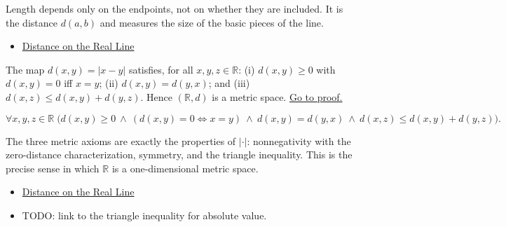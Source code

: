 \begin{remark*}[Interpretation]
Length depends only on the endpoints, not on whether they are included. It is the distance $d(a,b)$ and measures the size of the basic pieces of the line.
\end{remark*}
\begin{dependencies}
\begin{itemize}
  \item \hyperref[def:distance-on-real-line]{Distance on the Real Line}
\end{itemize}
\end{dependencies}
\begin{tcolorbox}[colback=thmbox, colframe=thmborder, arc=2pt,
  left=6pt, right=6pt, top=4pt, bottom=4pt,
  title={\small\textbf{Theorem (The Distance Function Is a Metric)}},
  fonttitle=\small\bfseries]
\begin{theorem}
\label{thm:distance-is-a-metric}
The map $d(x,y)=|x-y|$ satisfies, for all $x,y,z\in\mathbb{R}$: (i) $d(x,y)\ge 0$ with $d(x,y)=0$ iff $x=y$; (ii) $d(x,y)=d(y,x)$; and (iii) $d(x,z)\le d(x,y)+d(y,z)$. Hence $(\mathbb{R},d)$ is a metric space.
\hyperref[prf:distance-is-a-metric]{Go to proof.}
\end{theorem}
\end{tcolorbox}
\begin{remark*}
\[
\forall x,y,z\in\mathbb{R}\;\bigl(d(x,y)\ge 0\ \land\ (d(x,y)=0\Leftrightarrow x=y)\ \land\ d(x,y)=d(y,x)\ \land\ d(x,z)\le d(x,y)+d(y,z)\bigr).
\]
\end{remark*}
\begin{remark*}[Interpretation]
The three metric axioms are exactly the properties of $|\cdot|$: nonnegativity with the zero-distance characterization, symmetry, and the triangle inequality. This is the precise sense in which $\mathbb{R}$ is a one-dimensional metric space.
\end{remark*}
\begin{dependencies}
\begin{itemize}
  \item \hyperref[def:distance-on-real-line]{Distance on the Real Line}
  \item TODO: link to the triangle inequality for absolute value.
\end{itemize}
\end{dependencies}
